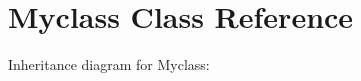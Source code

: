\hypertarget{classMyclass}{}\section{Myclass Class Reference}
\label{classMyclass}


Inheritance diagram for Myclass\+:
